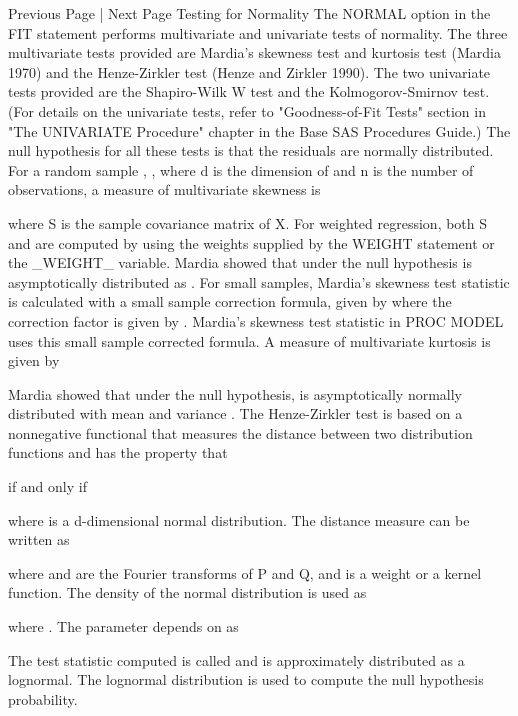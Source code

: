 
Previous Page | Next Page
Testing for Normality
The NORMAL option in the FIT statement performs multivariate and univariate tests of normality.
The three multivariate tests provided are Mardia’s skewness test and kurtosis test (Mardia 1970) and the Henze-Zirkler  test (Henze and Zirkler 1990). The two univariate tests provided are the Shapiro-Wilk W test and the Kolmogorov-Smirnov test. (For details on the univariate tests, refer to "Goodness-of-Fit Tests" section in "The UNIVARIATE Procedure" chapter in the Base SAS Procedures Guide.) The null hypothesis for all these tests is that the residuals are normally distributed.
For a random sample , , where d is the dimension of  and n is the number of observations, a measure of multivariate skewness is
 		 	 
where S is the sample covariance matrix of X. For weighted regression, both S and  are computed by using the weights supplied by the WEIGHT statement or the _WEIGHT_ variable.
Mardia showed that under the null hypothesis  is asymptotically distributed as . For small samples, Mardia’s skewness test statistic is calculated with a small sample correction formula, given by  where the correction factor  is given by . Mardia’s skewness test statistic in PROC MODEL uses this small sample corrected formula.
A measure of multivariate kurtosis is given by
 		 	 
Mardia showed that under the null hypothesis,  is asymptotically normally distributed with mean  and variance .
The Henze-Zirkler test is based on a nonnegative functional  that measures the distance between two distribution functions and has the property that
 		 	 
if and only if
 		 	 
where  is a d-dimensional normal distribution.
The distance measure  can be written as
 		 	 
where  and  are the Fourier transforms of P and Q, and  is a weight or a kernel function. The density of the normal distribution  is used as 
 		 	 
where .
The parameter  depends on  as
 		 	 
The test statistic computed is called  and is approximately distributed as a lognormal. The lognormal distribution is used to compute the null hypothesis probability.
 				 	 
